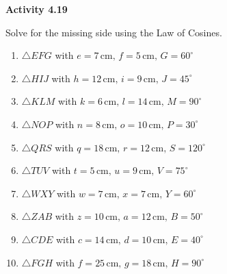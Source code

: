 \vspace{0.3ex}
\noindent\textbf{Activity 4.19}

\vspace{0.2ex}

Solve for the missing side using the Law of Cosines.

\begin{enumerate}
    \item \(\triangle EFG\) with \(e = 7 \, \text{cm}, \, f = 5 \, \text{cm}, \, G = 60^\circ\)
    \item \(\triangle HIJ\) with \(h = 12 \, \text{cm}, \, i = 9 \, \text{cm}, \, J = 45^\circ\)
    \item \(\triangle KLM\) with \(k = 6 \, \text{cm}, \, l = 14 \, \text{cm}, \, M = 90^\circ\)
    \item \(\triangle NOP\) with \(n = 8 \, \text{cm}, \, o = 10 \, \text{cm}, \, P = 30^\circ\)
    \item \(\triangle QRS\) with \(q = 18 \, \text{cm}, \, r = 12 \, \text{cm}, \, S = 120^\circ\)
    \item \(\triangle TUV\) with \(t = 5 \, \text{cm}, \, u = 9 \, \text{cm}, \, V = 75^\circ\)
    \item \(\triangle WXY\) with \(w = 7 \, \text{cm}, \, x = 7 \, \text{cm}, \, Y = 60^\circ\)
    \item \(\triangle ZAB\) with \(z = 10 \, \text{cm}, \, a = 12 \, \text{cm}, \, B = 50^\circ\)
    \item \(\triangle CDE\) with \(c = 14 \, \text{cm}, \, d = 10 \, \text{cm}, \, E = 40^\circ\)
    \item \(\triangle FGH\) with \(f = 25 \, \text{cm}, \, g = 18 \, \text{cm}, \, H = 90^\circ\)
\end{enumerate}
